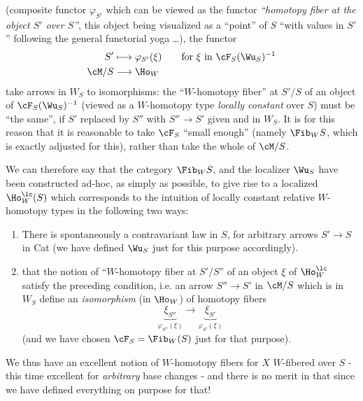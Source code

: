 (composite functor $\varphi_{S'}$ which can be viewed as the functor \textit{``homotopy fiber at the object $S'$ over $S$''}, this object being visualized as a ``point'' of $S$ ``with values in $S'$ '' following the general functorial yoga \dots), the functor
\[
\begin{aligned}
S' &\longmapsto \varphi_{S'}(\xi) \qquad \text{for } \xi \text{ in } \cF_S(\Wu_S)^{-1}\\
\cM/S &\longrightarrow \Ho_W
\end{aligned}
\]
take arrows in $W_S$ to isomorphisms: the ``$W$-homotopy fiber'' at $S'/S$ of an object of $\cF_S(\Wu_S)^{-1}$ (viewed as a $W$-homotopy type \textit{locally constant} over $S$) must be ``the same'', if $S'$ replaced by $S''$ with $S'' \longrightarrow S'$ given and in $W_S$. It is for this reason that it is reasonable to take $\cF_S$ ``small enough'' (namely $\Fib_W S$, which is  exactly adjusted for this), rather than take the whole of $\cM/S$.

We can therefore say that the category $\Fib_W S$, and the localizer $\Wu_S$ have been constructed ad-hoc, as simply as possible, to give rise to a localized $\Ho^{\lc}_W(S)$ which corresponds to the intuition of locally constant relative $W$-homotopy types in the following two ways:

\begin{enumerate}[label={}]
\item[1°)] There is spontaneously a contravariant law in $S$, for arbitrary arrows $S' \longrightarrow S$ in Cat (we have defined $\Wu_S$ just for this purpose accordingly).
\item[2°)] that the notion of ``$W$-homotopy fiber at $S'/S$'' of an object $\xi$ of $\Ho^{\lc}_W$ satisfy the preceding condition, i.e. an arrow $S'' \longrightarrow S'$ in $\cM/S$ which is in $W_S$ define an \textit{isomorphism} (in $\Ho_W$) of homotopy fibers
\[
\underbrace{\xi_{S''}}_{\varphi_{S''}(\xi)} \longrightarrow \underbrace{\xi_{S'}}_{\varphi_{S'}(\xi)}
\]
(and we have chosen $\cF_S = \Fib_W(S)$ just for that purpose).
\end{enumerate}


We thus have an excellent notion of $W$-homotopy fibers for $X$ $W$-fibered over $S$ - this time excellent for \textit{arbitrary} base changes - and there is no merit in that since we have defined everything on purpose for that! %

